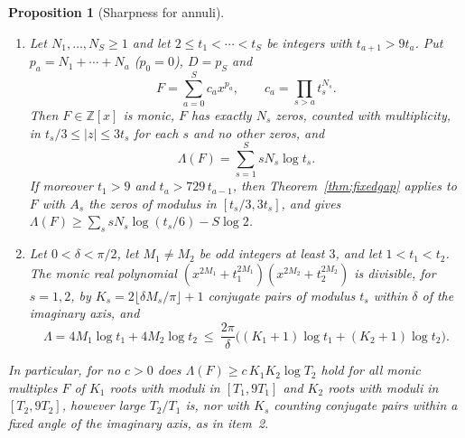 \documentclass[11pt]{article}
\newtheorem{proposition}[theorem]{Proposition}
\begin{document}
\begin{proposition}[Sharpness for annuli]\label{prop:annulisharp}
\leavevmode
\begin{enumerate}
\item Let $N_1,\ldots,N_S\ge1$ and let $2\le t_1<\cdots<t_S$ be integers with
$t_{a+1}>9t_a$.  Put $p_a=N_1+\cdots+N_a$ ($p_0=0$), $D=p_S$ and
\[
  F=\sum_{a=0}^Sc_ax^{p_a},\qquad c_a=\prod_{s>a}t_s^{N_s}.
\]
Then $F\in\mathbb Z[x]$ is monic, $F$ has exactly $N_s$ zeros, counted with
multiplicity, in $t_s/3\le|z|\le3t_s$ for each $s$ and no other zeros, and
\[
  \Lambda(F)=\sum_{s=1}^SsN_s\log t_s .
\]
If moreover $t_1>9$ and $t_a>729\,t_{a-1}$, then
Theorem~\ref{thm:fixedgap} applies to $F$ with $A_s$ the zeros of modulus in
$[t_s/3,3t_s]$, and gives $\Lambda(F)\ge\sum_ssN_s\log(t_s/6)-S\log2$.
\item Let $0<\delta<\pi/2$, let $M_1\ne M_2$ be odd integers at least $3$,
and let $1<t_1<t_2$.  The monic real polynomial
$(x^{2M_1}+t_1^{2M_1})(x^{2M_2}+t_2^{2M_2})$ is divisible, for $s=1,2$, by
$K_s=2\lfloor\delta M_s/\pi\rfloor+1$ conjugate pairs of modulus $t_s$
within $\delta$ of the imaginary axis, and
\[
  \Lambda=4M_1\log t_1+4M_2\log t_2\ \le\
  \frac{2\pi}\delta\bigl((K_1+1)\log t_1+(K_2+1)\log t_2\bigr).
\]
\end{enumerate}
In particular, for no $c>0$ does $\Lambda(F)\ge c\,K_1K_2\log T_2$ hold for
all monic multiples $F$ of $K_1$ roots with moduli in $[T_1,9T_1]$ and $K_2$
roots with moduli in $[T_2,9T_2]$, however large $T_2/T_1$ is, nor with $K_s$
counting conjugate pairs within a fixed angle of the imaginary axis, as in
item~2.
\end{proposition}
\end{document}
